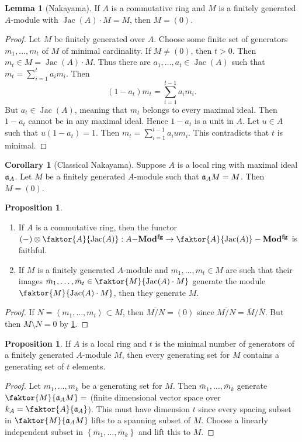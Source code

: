 \documentclass[10pt,letterpaper,cm]{nupset}
\theoremstyle{definition}
\theoremstyle{theorem}
\newtheorem{lemma}[definition]{Lemma}
\newtheorem{prop}[definition]{Proposition}
\newtheorem{corollary}[definition]{Corollary}
\theoremstyle{remark}
\newcommand{\1}{\mathbf{1}}
\newcommand{\0}{\vec 0}
\DeclareMathOperator{\Jac}{Jac}
\begin{document}
\begin{lemma}[Nakayama]\label{Nak}
If $A$ is a commutative ring and $M$ is a finitely generated $A$-module with $\Jac(A) \cdot M = M$, then $M= \left(0\right)$.
\end{lemma}
\begin{proof}
Let $M$ be finitely generated over $A$. Choose some finite set of generators $m_1, \ldots, m_t$ of $M$ of minimal cardinality. If $M\ne (0)$, then $t>0$. Then $m_t \in M = \Jac(A)\cdot M$. Thus there are $a_1, \ldots, a_t \in \Jac(A)$ such that $m_t = \sum_{i=1}^t a_im_i$. Then $$\left(1-a_t\right)m_t = \sum_{i=1}^{t-1} a_im_i.$$ But $a_t \in \Jac(A)$, meaning that $m_t$ belongs to every maximal ideal. Then $1-a_t$ cannot be in any maximal ideal. Hence $1-a_t$ is a unit in $A$. Let $u\in A$ such that $u(1-a_t) = 1$. Then $m_t = \sum_{i=1}^{t-1} a_iu m_i$. This contradicts that $t$ is minimal.
\end{proof}

\begin{corollary}[Classical Nakayama]
Suppose $A$ is a local ring with maximal ideal $\frak{a}_A$. Let $M$ be a finitely generated $A$-module such that $\frak{a}_AM = M$. Then $M= \left(0\right)$. 
\end{corollary}

\begin{prop} $ $
\begin{enumerate}
\item If $A$ is a commutative ring,  then the functor $\left(-\right) \otimes \faktor{A}{\Jac(A)} : A{-}\mathbf{Mod^{fg}} \to \faktor{A}{\Jac(A)} - \mathbf{Mod^{fg}}$ is faithful.  
\item If $M$ is a finitely generated $A$-module and $m_1, \ldots, m_t \in M$ are such that their images $\bar{m}_1, \ldots, \bar{m}_t \in \faktor{M}{\Jac(A) \cdot M}$ generate the module $\faktor{M}{\Jac(A)\cdot M}$, then they generate $M$.
\end{enumerate}
\end{prop}
\begin{proof}
If $N = \left\langle m_1, \ldots, m_t \right\rangle \subset M$, then $\overline{M/N} = \left(0\right)$ since $\overline{M/N} = \overline{M}/\overline{N}$. But then $M \setminus N = 0$ by \cref{Nak}. 
\end{proof}

\begin{prop}
If $A$ is a local ring and $t$ is the minimal number of generators of a finitely generated $A$-module $M$, then every generating set for $M$ contains a generating set of $t$ elements. 
\end{prop}
\begin{proof}
Let $m_1, \ldots, m_k$ be a generating set for $M$. Then $\bar{m}_1, \ldots, \bar{m}_k$ generate $\faktor{M}{\frak{a}_A M} =$ (finite dimensional vector space over $k_A = \faktor{A}{\frak{a}_A}$). This must have dimension $t$ since every spacing subset in $\faktor{M}{\frak{a}_A M}$ lifts to a spanning subset of $M$. Choose a linearly independent subset in $\left\{\bar{m}_1, \ldots, \bar{m}_k\right\}$ and lift this to $M$.
\end{proof}
\end{document}

